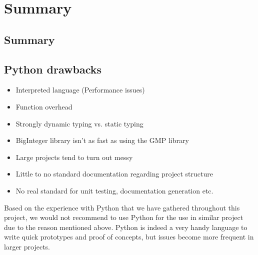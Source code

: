 \documentclass[a4paper,12pt]{report}
\begin{document}
\chapter{Summary}
\section{Summary}
\section{Python drawbacks}

\begin{itemize}
	\item Interpreted language (Performance issues)
	\item Function overhead
	\item Strongly dynamic typing vs. static typing
	\item BigInteger library isn’t as fast as using the GMP library
	\item Large projects tend to turn out messy
	\item Little to no standard documentation regarding project structure
	\item No real standard for unit testing, documentation generation etc.
\end{itemize}

Based on the experience with Python that we have gathered throughout this project, we would not recommend to use Python for the use in similar project due to the reason mentioned above. Python is indeed a very handy language to write quick prototypes and proof of concepts, but issues become more frequent in larger projects.

%
\end{document}
